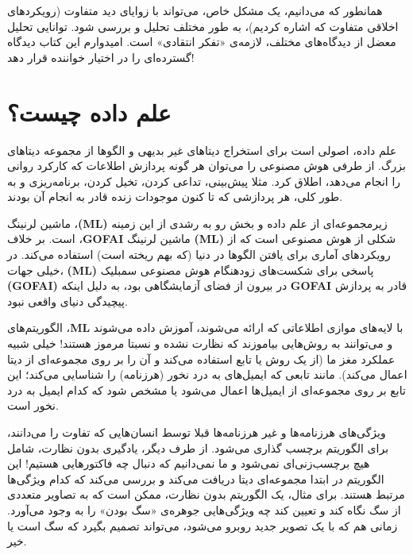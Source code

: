 همانطور که می‌دانیم، یک مشکل خاص، می‌تواند با زوایای دید متفاوت (رویکردهای اخلاقی متفاوت که اشاره کردیم)، به طور مختلف تحلیل و بررسی شود.
توانایی تحلیل معضل از دیدگاه‌های مختلف، لازمه‌ی «تفکر انتقادی» است.
امیدوارم این کتاب دیدگاه گسترده‌ای را در اختیار خواننده قرار دهد!

\newpage

{
\section*{علم داده چیست؟}
\label{sec:علم داده چیست؟}
علم داده، اصولی است برای استخراج دیتاهای غیر بدیهی و الگوها از مجموعه دیتاهای بزرگ.
از طرفی هوش مصنوعی را می‌توان هر گونه پردازش اطلاعات که کارکرد روانی را انجام می‌دهد، اطلاق کرد.
مثلا پیش‌بینی، تداعی کردن، تخیل کردن، برنامه‌ریزی و به طور کلی، هر پردازشی که تا کنون موجودات زنده قادر به انجام آن بودند.
}

ماشین لرنینگ ،\textenglish{\textbf{(ML)}} زیرمجموعه‌ای از علم داده و بخش رو به رشدی از این زمینه است.
بر خلاف ،\textenglish{\textbf{GOFAI}} ماشین لرنینگ \textenglish{\textbf{(ML)}} شکلی از هوش مصنوعی است که از رویکردهای آماری برای یافتن الگوها در دنیا (که بهم ریخته است) استفاده می‌کند.
در خیلی جهات، \textenglish{\textbf{(ML)}} پاسخی برای شکست‌های زودهنگام هوش مصنوعی سمبلیک \textenglish{\textbf{(GOFAI)}}  در بیرون از فضای آزمایشگاهی بود، به دلیل اینکه \textenglish{\textbf{GOFAI}} قادر به پردازش پیچیدگی دنیای واقعی نبود.

الگوریتم‌های ،\textenglish{\textbf{ML}} با لایه‌های موازی اطلاعاتی که ارائه می‌شوند، آموزش داده می‌شوند و می‌توانند به روش‌هایی بیاموزند که نظارت نشده و نسبتا مرموز هستند!
خیلی شبیه عملکرد مغز ما (از یک روش یا تابع استفاده می‌کند و آن را بر روی مجموعه‌ای از دیتا اعمال می‌کند).
مانند تابعی که ایمیل‌های به درد نخور (هرزنامه) را شناسایی می‌کند؛ این تابع بر روی مجموعه‌ای از ایمیل‌ها اعمال می‌شود یا مشخص شود که کدام ایمیل به درد نخور است.

ویژگی‌های هرزنامه‌ها و غیر هرزنامه‌ها قبلا توسط انسان‌هایی که تفاوت را می‌دانند، برای الگوریتم برچسب گذاری می‌شود.
از طرف دیگر، یادگیری بدون نظارت، شامل هیچ برچسب‌زنی‌ای نمی‌شود و ما نمی‌دانیم که دنبال چه فاکتورهایی هستیم!
این الگوریتم در ابتدا مجموعه‌ای دیتا دریافت می‌کند و بررسی می‌کند که کدام ویژگی‌ها مرتبط هستند.
برای مثال، یک الگوریتم بدون نظارت، ممکن است که به تصاویر متعددی از سگ نگاه کند و تعیین کند چه ویژگی‌هایی جوهره‌ی «سگ بودن» را به وجود می‌آورد.
زمانی هم که با یک تصویر جدید روبرو می‌شود، می‌تواند تصمیم بگیرد که سگ است یا خیر.

